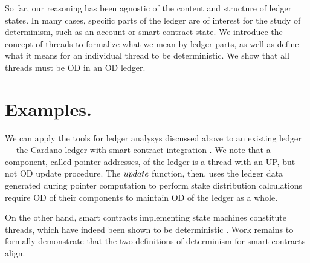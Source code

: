 So far, our reasoning has been agnostic of the content and structure of ledger
states. In many cases, specific parts of the ledger are of interest for the
study of determinism, such as an account or smart contract state. We introduce
the concept of threads to formalize what we mean by ledger parts, as well
as define what it means for an individual thread to be deterministic.
We show that all threads must be OD in an OD ledger.


\section{Examples. }
\label{sec:examples}

We can apply the tools for ledger analysys discussed above to an existing ledger ---
the Cardano ledger with smart contract integration \cite{alonzo}.
We note that a component, called pointer addresses,
of the ledger is a thread with an UP, but not OD update
procedure. The $\ups$ function, then, uses the ledger data generated during pointer
computation to perform stake distribution calculations require OD of their
components to maintain OD of the ledger as a whole.

On the other hand, smart contracts implementing state machines \cite{eutxo-ma} constitute threads,
which have indeed been shown to be deterministic \cite{alonzo}. Work remains to formally demonstrate
that the two definitions of determinism for smart contracts align.
